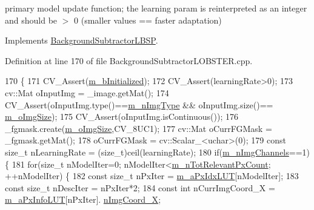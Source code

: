 primary model update function; the learning param is reinterpreted as an integer and should be $>$ 0 (smaller values == faster adaptation) 



Implements \mbox{\hyperlink{class_background_subtractor_l_b_s_p_a4771cac59b7ac865d6ec25cbf049948e}{Background\+Subtractor\+L\+B\+SP}}.



Definition at line 170 of file Background\+Subtractor\+L\+O\+B\+S\+T\+E\+R.\+cpp.


\begin{DoxyCode}
170                                                                                                            
       \{
171     CV\_Assert(\mbox{\hyperlink{class_background_subtractor_l_b_s_p_a55cea104a0924fd50d5bed0912828a7e}{m\_bInitialized}});
172     CV\_Assert(learningRate>0);
173     cv::Mat oInputImg = \_image.getMat();
174     CV\_Assert(oInputImg.type()==\mbox{\hyperlink{class_background_subtractor_l_b_s_p_a7d2f52ecd5ff56e42da86f97e0ad93b5}{m\_nImgType}} && oInputImg.size()==
      \mbox{\hyperlink{class_background_subtractor_l_b_s_p_a732d5e6ae35fb0e858cadb3af5ce08a2}{m\_oImgSize}});
175     CV\_Assert(oInputImg.isContinuous());
176     \_fgmask.create(\mbox{\hyperlink{class_background_subtractor_l_b_s_p_a732d5e6ae35fb0e858cadb3af5ce08a2}{m\_oImgSize}},CV\_8UC1);
177     cv::Mat oCurrFGMask = \_fgmask.getMat();
178     oCurrFGMask = cv::Scalar\_<uchar>(0);
179     \textcolor{keyword}{const} \textcolor{keywordtype}{size\_t} nLearningRate = (size\_t)ceil(learningRate);
180     \textcolor{keywordflow}{if}(\mbox{\hyperlink{class_background_subtractor_l_b_s_p_ab3467ebee2c5d1249061ccd704cc0584}{m\_nImgChannels}}==1) \{
181         \textcolor{keywordflow}{for}(\textcolor{keywordtype}{size\_t} nModelIter=0; nModelIter<\mbox{\hyperlink{class_background_subtractor_l_b_s_p_ac3b54f4d2dfa3a576475214f26501d85}{m\_nTotRelevantPxCount}}; ++nModelIter) \{
182             \textcolor{keyword}{const} \textcolor{keywordtype}{size\_t} nPxIter = \mbox{\hyperlink{class_background_subtractor_l_b_s_p_a06b4f0d3f24fa08bccd3c9eca085713e}{m\_aPxIdxLUT}}[nModelIter];
183             \textcolor{keyword}{const} \textcolor{keywordtype}{size\_t} nDescIter = nPxIter*2;
184             \textcolor{keyword}{const} \textcolor{keywordtype}{int} nCurrImgCoord\_X = \mbox{\hyperlink{class_background_subtractor_l_b_s_p_a74e73d4832ccdef652d93756582024db}{m\_aPxInfoLUT}}[nPxIter].
      \mbox{\hyperlink{struct_background_subtractor_l_b_s_p_1_1_px_info_base_a10966fe72f000045adede9e853156b48}{nImgCoord\_X}};

\end{DoxyCode}
